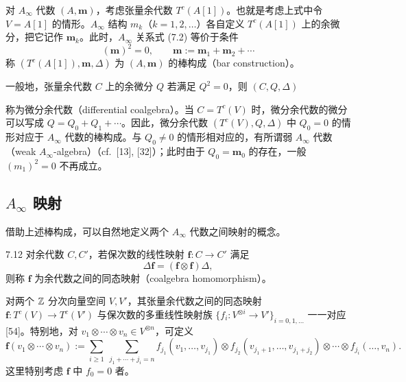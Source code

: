 对 $A_\infty$ 代数 $(A,\mathbf m)$，考虑张量余代数 $T^{c}(A[1])$。也就是考虑上式中令 $V=A[1]$ 的情形。$A_\infty$ 结构 $m_{k}$（$k=1,2,\dots$）各自定义 $T^{c}(A[1])$ 上的余微分，把它记作 $\mathbf m_{k}$。此时，$A_\infty$ 关系式 (7.2) 等价于条件
\[
  (\mathbf m)^{2}=0,\qquad \mathbf m:=\mathbf m_{1}+\mathbf m_{2}+\cdots
\]
称 $(T^{c}(A[1]),\mathbf m,\Delta)$ 为 $(A,\mathbf m)$ 的棒构成（bar construction）。


一般地，张量余代数 $C$ 上的余微分 $Q$ 若满足 $Q^{2}=0$，则 $(C,Q,\Delta)$

称为微分余代数（differential coalgebra）。当 $C=T^{c}(V)$ 时，微分余代数的微分可以写成 $Q=Q_{0}+Q_{1}+\cdots$。因此，微分余代数 $(T^{c}(V),Q,\Delta)$ 中 $Q_{0}=0$ 的情形对应于 $A_\infty$ 代数的棒构成。与 $Q_{0}\ne 0$ 的情形相对应的，有所谓弱 $A_\infty$ 代数（weak $A_\infty$-algebra）（cf.\ [13], [32]）；此时由于 $Q_{0}=\mathbf m_{0}$ 的存在，一般 $(m_{1})^{2}=0$ 不再成立。


\subsection{$A_\infty$ 映射}

借助上述棒构成，可以自然地定义两个 $A_\infty$ 代数之间映射的概念。

\begin{definition}{7.12}
对余代数 $C,C'$，若保次数的线性映射 $\mathbf f\colon C\to C'$ 满足
\[
  \Delta\mathbf f=(\mathbf f\otimes\mathbf f)\Delta,
\]
则称 $\mathbf f$ 为余代数之间的同态映射（coalgebra homomorphism）。
\end{definition}

对两个 $\mathbb{Z}$ 分次向量空间 $V,V'$，其张量余代数之间的同态映射 $\mathbf f\colon T^{c}(V)\to T^{c}(V')$ 与保次数的多重线性映射族 $\{f_{i}\colon V^{\otimes i}\to V'\}_{i=0,1,\dots}$ 一一对应 [54]。特别地，对 $v_{1}\otimes\cdots\otimes v_{n}\in V^{\otimes n}$，可定义
\[
  \mathbf f(v_{1}\otimes\cdots\otimes v_{n}):=\sum_{i\ge 1}\ \sum_{j_{1}+\cdots+j_{i}=n}f_{j_{1}}(v_{1},\dots,v_{j_{1}})\otimes f_{j_{2}}(v_{j_{1}+1},\dots,v_{j_{1}+j_{2}})\otimes\cdots\otimes f_{j_{i}}(\dots,v_{n}).
\]
这里特别考虑 $\mathbf f$ 中 $f_{0}=0$ 者。

